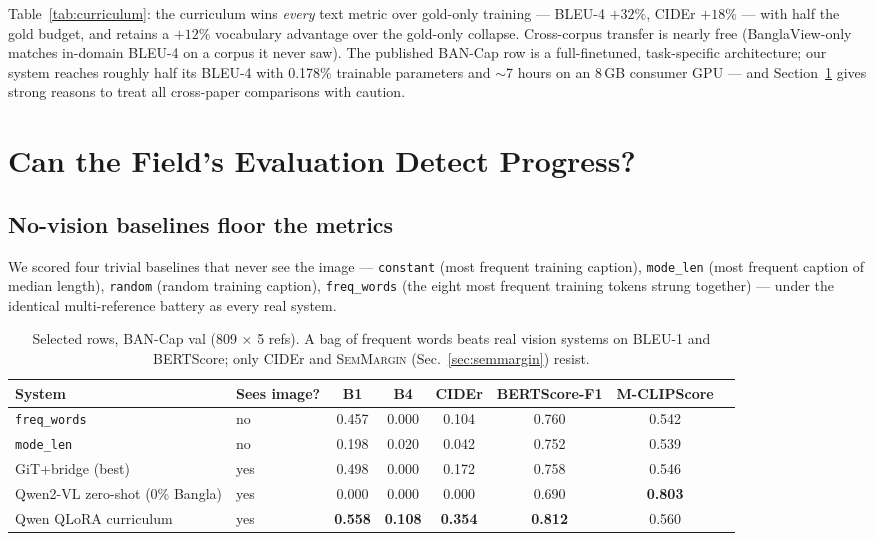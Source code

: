 \documentclass[11pt]{article}
\newcommand{\semmargin}{\textsc{SemMargin}}
\begin{document}
Table~\ref{tab:curriculum}: the curriculum wins \emph{every} text
metric over gold-only training --- BLEU-4 $+32\%$, CIDEr $+18\%$ ---
with half the gold budget, and retains a $+12\%$ vocabulary advantage
over the gold-only collapse. Cross-corpus transfer is nearly free
(BanglaView-only matches in-domain BLEU-4 on a corpus it never saw).
The published BAN-Cap row is a full-finetuned, task-specific
architecture; our system reaches roughly half its BLEU-4 with 0.178\%
trainable parameters and $\sim$7 hours on an 8\,GB consumer GPU ---
and Section~\ref{sec:audit} gives strong reasons to treat all
cross-paper comparisons with caution.

\section{Can the Field's Evaluation Detect Progress?}
\label{sec:audit}

\subsection{No-vision baselines floor the metrics}

We scored four trivial baselines that never see the image ---
\texttt{constant} (most frequent training caption), \texttt{mode\_len}
(most frequent caption of median length), \texttt{random} (random
training caption), \texttt{freq\_words} (the eight most frequent
training tokens strung together) --- under the identical multi-reference
battery as every real system.

\begin{table}[t]
\centering
\caption{Selected rows, BAN-Cap val (809 $\times$ 5 refs). A bag of
frequent words beats real vision systems on BLEU-1 and BERTScore; only
CIDEr and \semmargin{} (Sec.~\ref{sec:semmargin}) resist.}
\label{tab:trivial}
\small
\begin{tabular}{llcccccc}
\toprule
System & Sees image? & B1 & B4 & CIDEr & BERTScore-F1 & M-CLIPScore \\
\midrule
\texttt{freq\_words} & no & 0.457 & 0.000 & 0.104 & 0.760 & 0.542 \\
\texttt{mode\_len} & no & 0.198 & 0.020 & 0.042 & 0.752 & 0.539 \\
GiT+bridge (best) & yes & 0.498 & 0.000 & 0.172 & 0.758 & 0.546 \\
Qwen2-VL zero-shot (0\% Bangla) & yes & 0.000 & 0.000 & 0.000 & 0.690 & \textbf{0.803} \\
Qwen QLoRA curriculum & yes & \textbf{0.558} & \textbf{0.108} & \textbf{0.354} & \textbf{0.812} & 0.560 \\
\bottomrule
\end{tabular}
\end{table}
\end{document}
